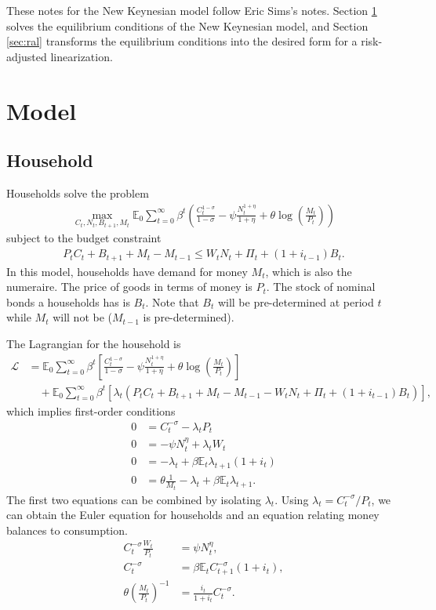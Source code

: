 \documentclass[12 pt, oneside]{article}
\theoremstyle{definition}
\theoremstyle{definition}
\theoremstyle{definition}
\newcommand{\E}{\mathbb{E}}
\newcommand{\calL}{\mathcal{L}}
\begin{document}
These notes for the New Keynesian model follow Eric Sims's notes. Section \ref{sec:model} solves the equilibrium conditions of the New Keynesian model, and Section \ref{sec:ral} transforms the equilibrium conditions into the desired form for a risk-adjusted linearization.

\section{Model}\label{sec:model}


\subsection{Household}

Households solve the problem
\begin{align*}
  \max_{C_t, N_t, B_{t + 1}, M_t} \E_0 \sum_{t = 0}^\infty \beta^t \left( \frac{C_t^{1 - \sigma}}{1 - \sigma} - \psi \frac{N_t^{1 + \eta}}{1 + \eta} + \theta\log\left(\frac{M_t}{P_t}\right) \right)
\end{align*}
subject to the budget constraint
\begin{align*}
  P_tC_t + B_{t + 1} + M_t - M_{t - 1} \leq W_t N_t + \Pi_t + (1 + i_{t - 1})B_t.
\end{align*}
In this model, households have demand for money $M_t$, which is also the numeraire. The price of goods in terms of money is $P_t$.
The stock of nominal bonds a households has is $B_t$.
Note that $B_t$ will be pre-determined at period $t$ while $M_t$ will not be ($M_{t - 1}$ is pre-determined).

The Lagrangian for the household is
\begin{align*}
\calL & = \E_0 \sum_{t = 0}^\infty \beta^t\left[\frac{C_t^{1 - \sigma}}{1 - \sigma} - \psi \frac{N_t^{1 + \eta}}{1 + \eta} + \theta\log\left(\frac{M_t}{P_t}\right)\right]\\
        &\quad + \E_0 \sum_{t = 0}^\infty \beta^t\left[\lambda_t(  P_tC_t + B_{t + 1} + M_t - M_{t - 1} - W_t N_t + \Pi_t + (1 + i_{t - 1})B_t)\right],
\end{align*}
which implies first-order conditions
\begin{align*}
  0 & = C_t^{- \sigma} - \lambda_t P_t\\
  0 & = -\psi N_t^\eta + \lambda_t W_t\\
  0 & = -\lambda_t + \beta \E_t\lambda_{t + 1}(1 + i_t)\\
  0 & = \theta \frac{1}{M_t} - \lambda_t + \beta\E_t\lambda_{t + 1}.
\end{align*}
The first two equations can be combined by isolating $\lambda_t$.
Using $\lambda_t = C_t^{-\sigma} / P_t$, we can obtain the Euler equation for households
and an equation relating money balances to consumption.
\begin{align*}
  C_t^{-\sigma} \frac{W_t}{P_t} & = \psi N_t^\eta,\\
  C_t^{-\sigma} & = \beta\E_t C_{t + 1}^{-\sigma} ( 1 + i_t),\\
  \theta\left(\frac{M_t}{P_t}\right)^{-1} & = \frac{i_t}{1 + i_t}C_t^{-\sigma}.
\end{align*}
\end{document}
